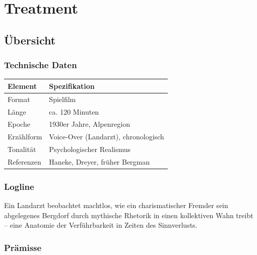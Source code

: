 \documentclass[11pt,a4paper,twoside]{book}
\begin{document}
\vspace*{\fill}
\newpage


\tableofcontents
\newpage


\part{Treatment}

\chapter{Übersicht}

\section{Technische Daten}

\begin{tabularx}{\textwidth}{lX}
\toprule
\textbf{Element} & \textbf{Spezifikation} \\
\midrule
Format & Spielfilm \\
Länge & ca. 120 Minuten \\
Epoche & 1930er Jahre, Alpenregion \\
Erzählform & Voice-Over (Landarzt), chronologisch \\
Tonalität & Psychologischer Realismus \\
Referenzen & Haneke, Dreyer, früher Bergman \\
\bottomrule
\end{tabularx}

\section{Logline}

\begin{tcolorbox}
Ein Landarzt beobachtet machtlos, wie ein charismatischer Fremder sein abgelegenes Bergdorf durch mythische Rhetorik in einen kollektiven Wahn treibt – eine Anatomie der Verführbarkeit in Zeiten des Sinnverlusts.
\end{tcolorbox}

\section{Prämisse}
\end{document}
